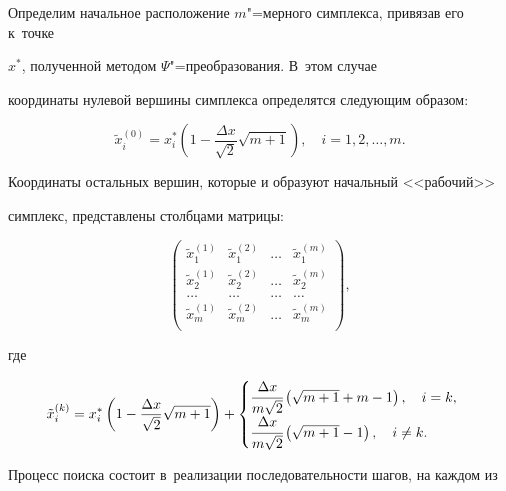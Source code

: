 Определим начальное расположение $m$"=мерного симплекса, привязав его к~точке

$x^\ast$, полученной методом $\Psi$"=преобразования. В~этом случае

координаты нулевой вершины симплекса определятся следующим образом:

\[

\tilde {x}_i^{(0)} =

x_i^\ast \left( 1-\frac{\Delta x}{\sqrt 2 }\sqrt {m+1} \right),

\quad

i=1,2,\ldots,m.

\]



Координаты остальных вершин, которые и образуют начальный <<рабочий>>

симплекс, представлены столбцами матрицы:

\[

\begin{pmatrix}

 \tilde {x}_1^{(1)} & \tilde {x}_1^{(2)} & \ldots & \tilde {x}_1^{(m)} \\

 \tilde {x}_2^{(1)} & \tilde {x}_2^{(2)} & \ldots & \tilde {x}_2^{(m)} \\

 \ldots & \ldots & \ldots & \ldots \\

 \tilde {x}_m^{(1)} & \tilde {x}_m^{(2)} & \ldots & \tilde {x}_m^{(m)} \\

\end{pmatrix},

\]

где

\[

\tilde {x}_i^{(k)} =

x_i^\ast \left( 1-\frac{\Delta x}{\sqrt 2 }\sqrt {m+1} \right)+

\begin{cases}

\cfrac{\Delta x}{m\sqrt 2 }\left( \sqrt {m+1} +m-1 \right), \quad i=k, \\

\cfrac{\Delta x}{m\sqrt 2 }\left( \sqrt {m+1} -1 \right), \quad i\ne k.

\end{cases}

\]



Процесс поиска состоит в~реализации последовательности шагов, на каждом из

